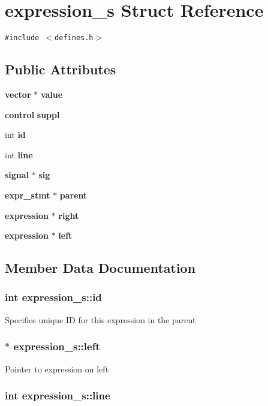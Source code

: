 \section{expression\_\-s Struct Reference}
\label{structexpression__s}
{\tt \#include $<$defines.h$>$}

\subsection*{Public Attributes}
\begin{CompactItemize}
\item 
{\bf vector} $\ast$ {\bf value}
\item 
{\bf control} {\bf suppl}
\item 
int {\bf id}
\item 
int {\bf line}
\item 
{\bf signal} $\ast$ {\bf sig}
\item 
{\bf expr\_\-stmt} $\ast$ {\bf parent}
\item 
{\bf expression} $\ast$ {\bf right}
\item 
{\bf expression} $\ast$ {\bf left}
\end{CompactItemize}


\subsection{Member Data Documentation}
\subsubsection{\setlength{\rightskip}{0pt plus 5cm}int {\bf expression\_\-s::id}}\label{structexpression__s_o2}


Specifies unique ID for this expression in the parent 
\subsubsection{$\ast$ {\bf expression\_\-s::left}}\label{structexpression__s_o7}


Pointer to expression on left 
\subsubsection{\setlength{\rightskip}{0pt plus 5cm}int {\bf expression\_\-s::line}}\label{structexpression__s_o3}



